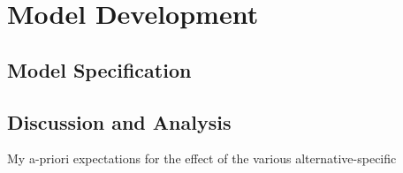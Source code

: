 \section{Model Development}
\subsection{Model Specification}
\subsection{Discussion and Analysis}
My a-priori expectations for the effect of the various alternative-specific